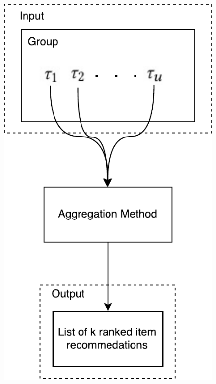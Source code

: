 \begin{frame}
\begin{columns}
\begin{column}{0.5\textwidth}
\begin{figure}
			\includegraphics[scale=.4]{graphics/setuptransposed}
		\end{figure}
	\end{column}
\end{columns}
\end{frame}

%
